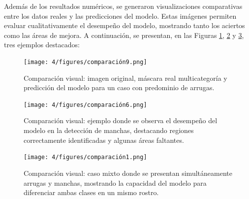 \begin{enumerate}
\begin{itemize}
Además de los resultados numéricos, se generaron visualizaciones comparativas entre los datos reales y las predicciones del modelo. Estas imágenes permiten evaluar cualitativamente el desempeño del modelo, mostrando tanto los aciertos como las áreas de mejora. A continuación, se presentan, en las Figuras \ref{fig:validacion1}, \ref{fig:validacion2} y \ref{fig:validacion3}, tres ejemplos destacados:

\vspace{0.5cm}

\begin{figure}[H]
\centering
\texttt{[image: 4/figures/comparación9.png]}
\caption{Comparación visual: imagen original, máscara real multicategoría y predicción del modelo para un caso con predominio de arrugas.}
\label{fig:validacion1}
\end{figure}

\begin{figure}[H]
\centering
\texttt{[image: 4/figures/comparación6.png]}
\caption{Comparación visual: ejemplo donde se observa el desempeño del modelo en la detección de manchas, destacando regiones correctamente identificadas y algunas áreas faltantes.}
\label{fig:validacion2}
\end{figure}

\begin{figure}[H]
\centering
\texttt{[image: 4/figures/comparación1.png]}
\caption{Comparación visual: caso mixto donde se presentan simultáneamente arrugas y manchas, mostrando la capacidad del modelo para diferenciar ambas clases en un mismo rostro.}
\label{fig:validacion3}
\end{figure}

  \end{itemize}


\end{enumerate}
